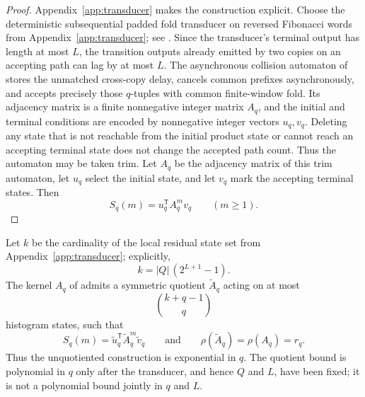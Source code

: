 \begin{proof}
Appendix~\ref{app:transducer} makes the construction explicit.  Choose the
deterministic subsequential padded fold transducer on reversed Fibonacci
words from Appendix~\ref{app:transducer}; see
.  Since the transducer's terminal output has
length at most \(L\), the transition outputs already emitted by two copies on
an accepting path can lag by at most \(L\).  The asynchronous collision automaton of
 stores the unmatched cross-copy delay,
cancels common prefixes asynchronously, and accepts precisely those
\(q\)-tuples with common finite-window fold.  Its adjacency
matrix is a finite nonnegative integer matrix \(A_q\), and the initial and
terminal conditions are encoded by nonnegative integer vectors \(u_q,v_q\).
Deleting any state that is not reachable from the initial product state or
cannot reach an accepting terminal state does not change the accepted path
count.  Thus the automaton may be taken trim.  Let \(A_q\) be the adjacency
matrix of this trim automaton, let \(u_q\) select the initial state, and let
\(v_q\) mark the accepting terminal states.  Then
\[
  S_q(m)=u_q^{\mathsf T}A_q^m v_q
  \qquad (m\ge 1).
\]
\end{proof}

\begin{theorem}
\label{thm:symmetric-compression}
Let \(k\) be the cardinality of the local residual state set from
Appendix~\ref{app:transducer}; explicitly,
\[
  k=|Q|\,(2^{L+1}-1).
\]
The kernel \(A_q\) of
 admits a symmetric quotient
\(\widetilde A_q\) acting on at most
\[
  \binom{k+q-1}{q}
\]
histogram states, such that
\[
  S_q(m)=\widetilde u_q^{\mathsf T}\widetilde A_q^m\widetilde v_q
  \qquad\text{and}\qquad
  \rho(\widetilde A_q)=\rho(A_q)=r_q.
\]
Thus the unquotiented construction is exponential in \(q\).  The quotient
bound is polynomial in \(q\) only after the transducer, and hence \(Q\) and
\(L\), have been fixed; it is not a polynomial bound jointly in \(q\) and
\(L\).
\end{theorem}

